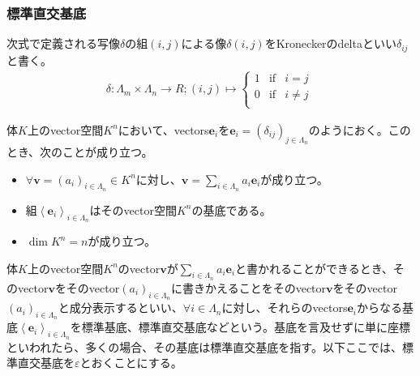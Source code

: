 \documentclass[dvipdfmx]{jsarticle}
\begin{document}
\subsubsection{標準直交基底}%
\begin{dfn}
次式で定義される写像$\delta$の組$(i,j)$による像$\delta(i,j)$をKroneckerのdeltaといい$\delta_{ij}$と書く。
\begin{align*}
\delta:\varLambda_{m} \times \varLambda_{n} \rightarrow R;(i,j) \mapsto \left\{ \begin{matrix}
1 & \mathrm{if} & i = j \\
0 & \mathrm{if} & i \neq j \\
\end{matrix} \right.\ 
\end{align*}
\end{dfn}
\begin{thm}\label{2.1.4.3}
体$K$上のvector空間$K^{n}$において、vectors$\mathbf{e}_{i}$を$\mathbf{e}_{i} = \left( \delta_{ij} \right)_{j \in \varLambda_{n}}$のようにおく。このとき、次のことが成り立つ。
\begin{itemize}
\item
  $\forall\mathbf{v} = \left( a_{i} \right)_{i \in \varLambda_{n}} \in K^{n}$に対し、$\mathbf{v} = \sum_{i \in \varLambda_{n}} {a_{i}\mathbf{e}_{i}}$が成り立つ。
\item
  組$\left\langle \mathbf{e}_{i} \right\rangle_{i \in \varLambda_{n}}$はそのvector空間$K^{n}$の基底である。
\item
  $\dim K^{n} = n$が成り立つ。
\end{itemize}
\end{thm}
\begin{dfn}
体$K$上のvector空間$K^{n}$のvector$\mathbf{v}$が$\sum_{i \in \varLambda_{n}} {a_{i}\mathbf{e}_{i}}$と書かれることができるとき、そのvector$\mathbf{v}$をそのvector$\left( a_{i} \right)_{i \in \varLambda_{n}}$に書きかえることをそのvector$\mathbf{v}$をそのvector$\left( a_{i} \right)_{i \in \varLambda_{n}}$と成分表示するといい、$\forall i \in \varLambda_{n}$に対し、それらのvectors$\mathbf{e}_{i}$からなる基底$\left\langle \mathbf{e}_{i} \right\rangle_{i \in \varLambda_{n}}$を標準基底、標準直交基底などという。基底を言及せずに単に座標といわれたら、多くの場合、その基底は標準直交基底を指す。以下ここでは、標準直交基底を$\varepsilon$とおくことにする。
\end{dfn}
\end{document}
